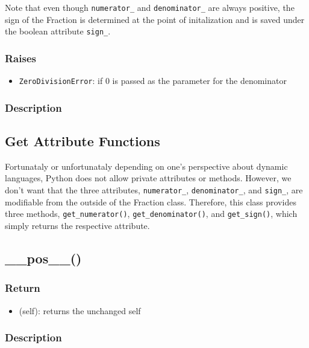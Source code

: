 \documentclass[refman]{scrartcl}
\begin{document}
Note that even though \texttt{numerator\_} and \texttt{denominator\_} are always positive, the sign of the Fraction is determined at the point of initalization and is saved under the boolean attribute \texttt{sign\_}.

\subsubsection*{Raises}

\begin{itemize}
  \item \texttt{ZeroDivisionError}: if \(0\) is passed as the parameter for the denominator
\end{itemize}

\subsubsection*{Description}

\subsection{Get Attribute Functions}

Fortunataly or unfortunataly depending on one's perspective about dynamic languages, Python does not allow private attributes or methods. However, we don't want that the three attributes, \texttt{numerator\_}, \texttt{denominator\_}, and \texttt{sign\_}, are modifiable from the outside of the Fraction class. Therefore, this class provides three methods, \texttt{get\_numerator()}, \texttt{get\_denominator()}, and \texttt{get\_sign()}, which simply returns the respective attribute.

\subsection{\_\_pos\_\_()}

\subsubsection*{Return}

\begin{itemize}
  \item (self): returns the unchanged self
\end{itemize}

\subsubsection*{Description}
\end{document}
